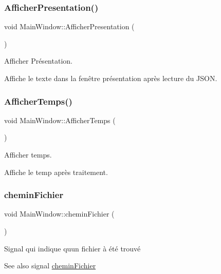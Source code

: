 \subsubsection{\texorpdfstring{Afficher\+Presentation()}{AfficherPresentation()}}
{\footnotesize\ttfamily void Main\+Window\+::\+Afficher\+Presentation (\begin{DoxyParamCaption}{ }\end{DoxyParamCaption})}



Afficher Présentation. 

Affiche le texte dans la fenêtre présentation après lecture du J\+S\+ON. \mbox{\label{class_main_window_a33811a52abf8f1ce71ec4e150d9c9ac8}} 
\subsubsection{\texorpdfstring{Afficher\+Temps()}{AfficherTemps()}}
{\footnotesize\ttfamily void Main\+Window\+::\+Afficher\+Temps (\begin{DoxyParamCaption}{ }\end{DoxyParamCaption})}



Afficher temps. 

Affiche le temp après traitement. \mbox{\label{class_main_window_a397116dafcb548fec351091cc025b822}} 
\subsubsection{\texorpdfstring{chemin\+Fichier}{cheminFichier}}
{\footnotesize\ttfamily void Main\+Window\+::chemin\+Fichier (\begin{DoxyParamCaption}\item[{Q\+String}]{ }\end{DoxyParamCaption})\hspace{0.3cm}{\ttfamily [signal]}}



Signal qui indique qu\textquotesingle{}un fichier à été trouvé 

\begin{DoxySeeAlso}{See also}
signal \hyperlink{class_main_window_a397116dafcb548fec351091cc025b822}{chemin\+Fichier} 
\end{DoxySeeAlso}

